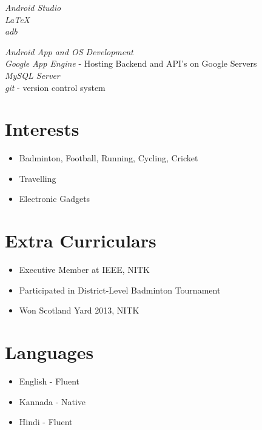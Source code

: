 \documentclass[10pt]{article} %
\begin{document}

{
\textit{Android Studio}\\
\textit{\LaTeX}\\
\textit{adb}\\
}


{
\textit{Android App and OS Development} \\
\textit{Google App Engine} - Hosting Backend and API's on Google Servers\\
\textit{MySQL Server}\\
\textit{git} - version control system
}


\section{Interests}

\begin{itemize}
\item{Badminton, Football, Running, Cycling, Cricket}
\item{Travelling}
\item{Electronic Gadgets}
\end{itemize}


\section{Extra Curriculars}
\begin{itemize}
\item{Executive Member at IEEE, NITK} 
\item{Participated in District-Level Badminton Tournament} 
\item{Won Scotland Yard 2013, NITK} 
\end{itemize}



\section{Languages}

\begin{itemize}
\item{English - Fluent} 
\item{Kannada - Native} 
\item{Hindi   - Fluent} 
\end{itemize}

\end{document}
